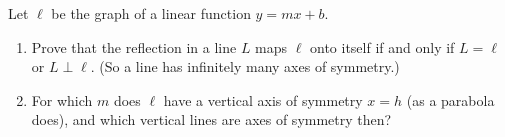 Let $\ell$ be the graph of a linear function $y=mx+b$.
\begin{enumerate}
\item[(a)] Prove that the reflection in a line $L$ maps $\ell$ onto itself if and only if $L=\ell$ or $L\perp\ell$. (So a line has infinitely many axes of symmetry.)
\item[(b)] For which $m$ does $\ell$ have a vertical axis of symmetry $x=h$ (as a parabola does), and which vertical lines are axes of symmetry then?
\end{enumerate}

